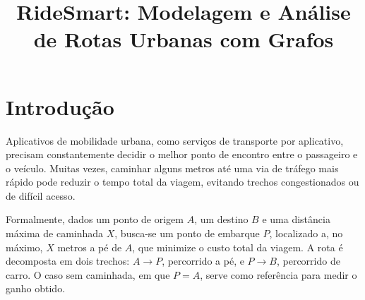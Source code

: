 \documentclass[conference]{IEEEtran}
\begin{document}
\title{RideSmart: Modelagem e Análise de Rotas Urbanas com Grafos}

\author{
    \and
    \and
}

\maketitle

\section{Introdução}
Aplicativos de mobilidade urbana, como serviços de transporte por aplicativo, precisam constantemente decidir o melhor ponto de encontro entre o passageiro e o veículo. Muitas vezes, caminhar alguns metros até uma via de tráfego mais rápido pode reduzir o tempo total da viagem, evitando trechos congestionados ou de difícil acesso.

Formalmente, dados um ponto de origem $A$, um destino $B$ e uma distância máxima de caminhada $X$, busca-se um ponto de embarque $P$, localizado a, no máximo, $X$ metros a pé de $A$, que minimize o custo total da viagem. A rota é decomposta em dois trechos: $A \to P$, percorrido a pé, e $P \to B$, percorrido de carro. O caso sem caminhada, em que $P = A$, serve como referência para medir o ganho obtido.
\end{document}
